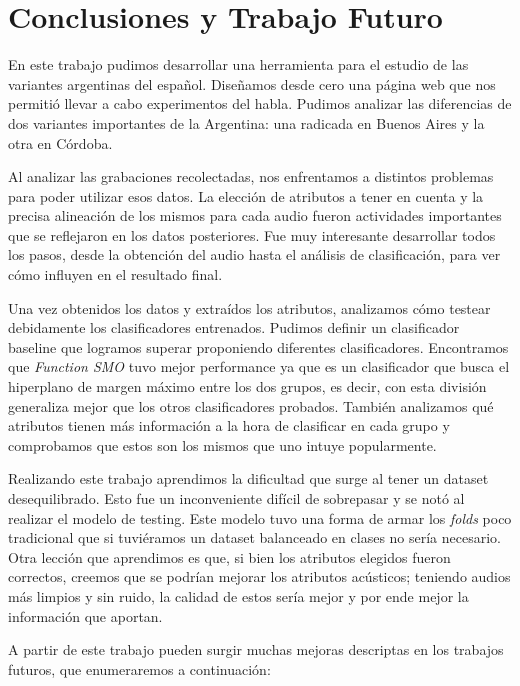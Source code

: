 \chapter{Conclusiones y Trabajo Futuro}

En este trabajo pudimos desarrollar una herramienta para el estudio de las variantes argentinas del español. Diseñamos desde cero una página web que nos permitió llevar a cabo experimentos del habla. Pudimos analizar las diferencias de dos variantes importantes de la Argentina: una radicada en Buenos Aires y la otra en Córdoba. 

Al analizar las grabaciones recolectadas, nos enfrentamos a distintos problemas para poder utilizar esos datos. La elección de atributos a tener en cuenta y la precisa alineación de los mismos para cada audio fueron actividades importantes que se reflejaron en los datos posteriores. Fue muy interesante desarrollar todos los pasos, desde la obtención del audio hasta el análisis de clasificación, para ver cómo influyen en el resultado final.

Una vez obtenidos los datos y extraídos los atributos, analizamos cómo testear debidamente los clasificadores entrenados. Pudimos definir un clasificador baseline que logramos superar proponiendo diferentes clasificadores. Encontramos que \textit{Function SMO} tuvo mejor performance ya que es un clasificador que busca el hiperplano de margen máximo entre los dos grupos, es decir, con esta división generaliza mejor que los otros clasificadores probados. También analizamos qué atributos tienen más información a la hora de clasificar en cada grupo y comprobamos que estos son los mismos que uno intuye popularmente.

Realizando este trabajo aprendimos la dificultad que surge al tener un dataset desequilibrado. Esto fue un inconveniente difícil de sobrepasar y se notó al realizar el modelo de testing. Este modelo tuvo una forma de armar los \textit{folds} poco tradicional que si tuviéramos un dataset balanceado en clases no sería necesario. Otra lección que aprendimos es que, si bien los atributos elegidos fueron correctos, creemos que se podrían mejorar los atributos acústicos; teniendo audios más limpios y sin ruido, la calidad de estos sería mejor y por ende mejor la información que aportan. 

A partir de este trabajo pueden surgir muchas mejoras descriptas en los trabajos futuros, que enumeraremos a continuación:

